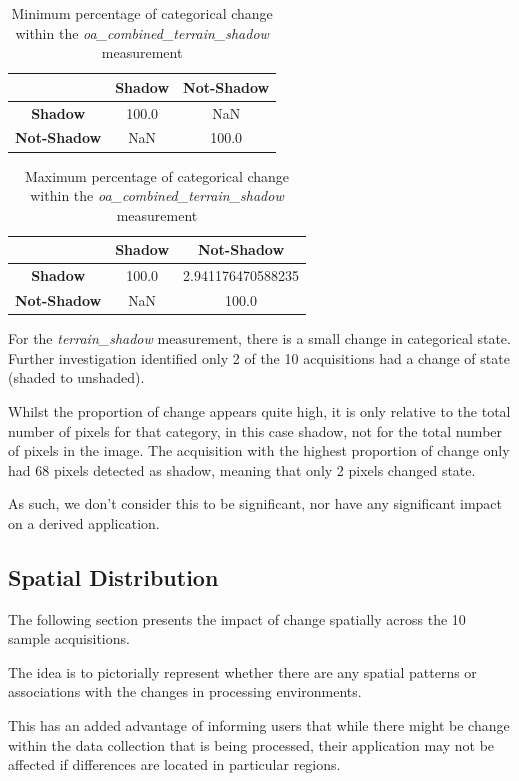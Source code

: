 \documentclass[a4paper]{article}
\begin{document}
    \begin{table}[ht!]
      \caption{Minimum percentage of categorical change within the \textit{oa\_combined\_terrain\_shadow} measurement}\label{table:11}
      \centering
      \begin{tabular}{ccc} \midrule
        & \textbf{Shadow} & \textbf{Not-Shadow} \\ \midrule
        \textbf{Shadow} & 100.0 & NaN \\
        \textbf{Not-Shadow} & NaN & 100.0 \\
      \end{tabular}
    \end{table}

    \begin{table}[ht!]
      \caption{Maximum percentage of categorical change within the \textit{oa\_combined\_terrain\_shadow} measurement}\label{table:12}
      \centering
      \begin{tabular}{ccc} \midrule
        & \textbf{Shadow} & \textbf{Not-Shadow} \\ \midrule
        \textbf{Shadow} & 100.0 & 2.941176470588235 \\
        \textbf{Not-Shadow} & NaN & 100.0 \\
      \end{tabular}
    \end{table}

    \begin{flushleft}
      For the \textit{terrain\_shadow} measurement, there is a small change in categorical state. Further investigation identified only 2 of the 10 acquisitions had a change of state (shaded to unshaded). \par
      Whilst the proportion of change appears quite high, it is only relative to the total number of pixels for that category, in this case shadow, not for the total number of pixels in the image. The acquisition with the highest proportion of change only had 68 pixels detected as shadow, meaning that only 2 pixels changed state. \par
      As such, we don't consider this to be significant, nor have any significant impact on a derived application.
    \end{flushleft}

    \subsection{Spatial Distribution}

      \begin{flushleft}
        The following section presents the impact of change spatially across the 10 sample acquisitions. \par
        The idea is to pictorially represent whether there are any spatial patterns or associations with the changes in processing environments. \par
        This has an added advantage of informing users that while there might be change within the data collection that is being processed, their application may not be affected if differences are located in particular regions.
      \end{flushleft}
\end{document}
